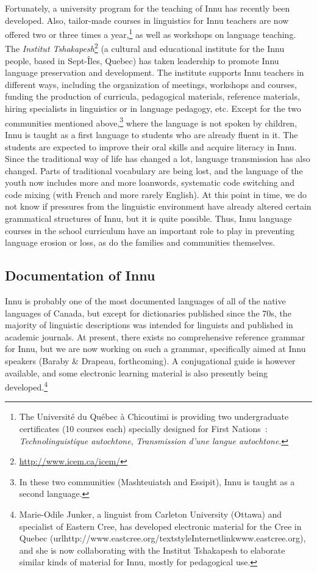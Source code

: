 Fortunately, a university program for the teaching of Innu has recently been developed. Also, tailor-made courses in linguistics for Innu teachers are now offered two or three times a year,\footnote{The
 Université du Québec à Chicoutimi is providing two undergraduate certificates (10 courses each) specially designed for First Nations~: \textit{Technolinguistique autochtone}, \textit{Transmission d'une langue autochtone}.
}
as well as workshops on language teaching. The \textit{Institut Tshakapesh}\footnote{\url{http://www.icem.ca/icem/}} (a cultural and educational institute for the Innu people, based in Sept-Îles, Quebec) has taken leadership to promote Innu language preservation and development. The institute supports Innu teachers in different ways, including the organization of meetings, workshops and courses, funding the production of curricula, pedagogical materials, reference materials, hiring specialists in linguistics or in language pedagogy, etc.
Except for the two communities mentioned above,\footnote{In
 these two communities (Mashteuiatsh and Essipit), Innu is taught as a second language.
}
where the language is not spoken by children, Innu is taught as a first language to students who are already fluent in it. The students are expected to improve their oral skills and acquire literacy in Innu. Since the traditional way of life has changed a lot, language transmission has also changed. Parts of traditional vocabulary are being lost, and the language of the youth now includes more and more loanwords, systematic code switching and code mixing (with French and more rarely English). At this point in time, we do not know if pressures from the linguistic environment have already altered certain grammatical structures of Innu, but it is quite possible. Thus, Innu language courses in the school curriculum have an important role to play in preventing language erosion or loss, as do the families and communities themselves. 

\subsection{Documentation of Innu} 
Innu is probably one of the most documented languages of all of the native languages of Canada, but except for dictionaries published since the 70s, the majority of linguistic descriptions was intended for linguists and published in academic journals.
At present, there exists no comprehensive reference grammar for Innu, but we are now working on such a grammar, specifically aimed at Innu speakers (Baraby \& Drapeau, forthcoming). A conjugational guide  \citep{Baraby2004} is however available, and some electronic learning material is also presently being developed.\footnote{Marie-Odile
 Junker, a linguist from Carleton University (Ottawa) and specialist of Eastern Cree, has developed electronic material for the Cree in Quebec (url{http://www.eastcree.org/}{textstyleInternetlink{www.eastcree.org}}), and she is now collaborating with the Institut Tshakapesh to elaborate similar kinds of material for Innu, mostly for pedagogical use.
}

